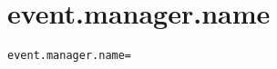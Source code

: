 \section{event.manager.name}
\label{configuration:EventManagerName}
\ClearAPI
\TODO
{}
\begin{lstlisting}[style=Props,caption={Usage example for \textit{event.manager.name}}]
event.manager.name=
\end{lstlisting}